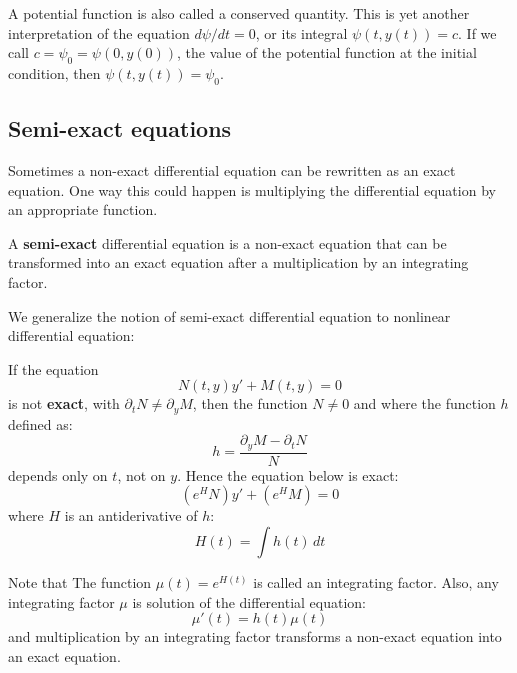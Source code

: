 A potential function is also called a conserved quantity. This is yet another interpretation of the equation $d\psi/dt=0$, or its integral $\psi(t,y(t))=c$. If we call $c=\psi_{0}=\psi(0,y(0))$, the value of the potential function at the initial condition, then $\psi(t,y(t))=\psi_{0}$. 
\subsection{Semi-exact equations}
Sometimes a non-exact differential equation can be rewritten as an exact equation. One way this could happen is multiplying the differential equation by an appropriate function.
\begin{definition}
    A \textbf{semi-exact} differential equation is a non-exact equation that can be transformed into an exact equation after a multiplication by an integrating factor. 
\end{definition}

We generalize the notion of semi-exact differential equation to nonlinear differential equation:
\begin{theorem}
    If the equation $$N(t,y)y'+M(t,y)=0$$
is not \textbf{exact}, with $\partial_{t}N\neq \partial_{y}M$, then the function $N\neq 0$ and where the function $h$ defined as: 
$$h=\frac{\partial_{y}M-\partial_{t}N}{N}$$
depends only on $t$, not on $y$. Hence the equation below is exact: 
$$(e^{H}N)y'+ (e^{H}M)=0$$
where $H$ is an antiderivative of $h$: $$H(t)=\int h(t) \, dt $$
\end{theorem}

Note that The function $\mu(t)=e^{H(t)}$ is called an integrating factor. Also, any integrating factor $\mu$ is solution of the differential equation: $$\mu'(t)=h(t)\mu(t)$$ and multiplication by an integrating factor transforms a non-exact equation into an exact equation.
